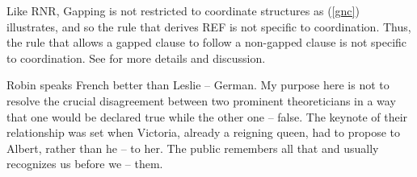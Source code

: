 \documentclass[output=paper]{langsci/langscibook}
\begin{document}


Like RNR, Gapping is not restricted to coordinate structures as (\ref{gnc}) illustrates,
and so the rule that derives REF is not specific to coordination. Thus, the rule that allows a gapped clause to follow a non-gapped clause is not specific to coordination. See \citet{sangheepark} for more details and discussion.

\begin{exe}
\ex 
\begin{xlista}
\ex Robin speaks French better than Leslie -- German.
\ex My purpose here is not to resolve the crucial disagreement between two prominent theoreticians in a way that one would be declared true while the other one -- false.
\ex The keynote of their relationship was set when Victoria, already a reigning queen,
had to propose to Albert, rather than he -- to her.
\ex The public remembers all that and usually recognizes us before we -- them.\\
\citep[\S 2]{sangheepark}
\end{xlista}\label{gnc}
\end{exe}
\end{document}
